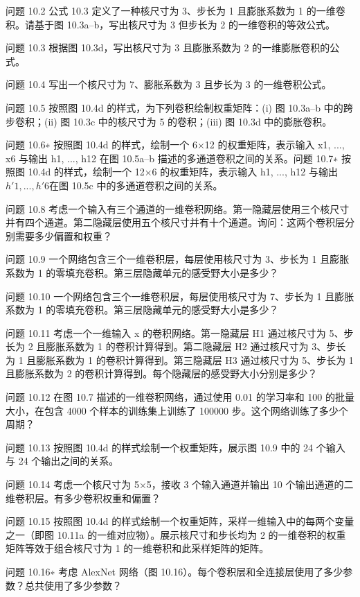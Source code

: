 \documentclass[lang=cn,newtx,10pt,scheme=chinese]{elegantbook}
\begin{document}
问题 10.2 公式 10.3 定义了一种核尺寸为 3、步长为 1 且膨胀系数为 1 的一维卷积。请基于图 10.3a–b，写出核尺寸为 3 但步长为 2 的一维卷积的等效公式。

问题 10.3 根据图 10.3d，写出核尺寸为 3 且膨胀系数为 2 的一维膨胀卷积的公式。

问题 10.4 写出一个核尺寸为 7、膨胀系数为 3 且步长为 3 的一维卷积公式。

问题 10.5 按照图 10.4d 的样式，为下列卷积绘制权重矩阵：(i) 图 10.3a–b 中的跨步卷积；(ii) 图 10.3c 中的核尺寸为 5 的卷积；(iii) 图 10.3d 中的膨胀卷积。

问题 10.6∗ 按照图 10.4d 的样式，绘制一个 6×12 的权重矩阵，表示输入 x1, ..., x6 与输出 h1, ..., h12 在图 10.5a–b 描述的多通道卷积之间的关系。问题 10.7∗ 按照图 10.4d 的样式，绘制一个 12×6 的权重矩阵，表示输入 h1, ..., h12 与输出 \(h \prime 1,...,h \prime 6 \)在图 10.5c 中的多通道卷积之间的关系。

问题 10.8 考虑一个输入有三个通道的一维卷积网络。第一隐藏层使用三个核尺寸并有四个通道。第二隐藏层使用五个核尺寸并有十个通道。询问：这两个卷积层分别需要多少偏置和权重？

问题 10.9 一个网络包含三个一维卷积层，每层使用核尺寸为 3、步长为 1 且膨胀系数为 1 的零填充卷积。第三层隐藏单元的感受野大小是多少？

问题 10.10 一个网络包含三个一维卷积层，每层使用核尺寸为 7、步长为 1 且膨胀系数为 1 的零填充卷积。第三层隐藏单元的感受野大小是多少？

问题 10.11 考虑一个一维输入 x 的卷积网络。第一隐藏层 H1 通过核尺寸为 5、步长为 2 且膨胀系数为 1 的卷积计算得到。第二隐藏层 H2 通过核尺寸为 3、步长为 1 且膨胀系数为 1 的卷积计算得到。第三隐藏层 H3 通过核尺寸为 5、步长为 1 且膨胀系数为 2 的卷积计算得到。每个隐藏层的感受野大小分别是多少？

问题 10.12 在图 10.7 描述的一维卷积网络，通过使用 0.01 的学习率和 100 的批量大小，在包含 4000 个样本的训练集上训练了 100000 步。这个网络训练了多少个周期？

问题 10.13 按照图 10.4d 的样式绘制一个权重矩阵，展示图 10.9 中的 24 个输入与 24 个输出之间的关系。

问题 10.14 考虑一个核尺寸为 5×5，接收 3 个输入通道并输出 10 个输出通道的二维卷积层。有多少卷积权重和偏置？

问题 10.15 按照图 10.4d 的样式绘制一个权重矩阵，采样一维输入中的每两个变量之一（即图 10.11a 的一维对应物）。展示核尺寸和步长均为 2 的一维卷积的权重矩阵等效于组合核尺寸为 1 的一维卷积和此采样矩阵的矩阵。

问题 10.16∗ 考虑 AlexNet 网络（图 10.16）。每个卷积层和全连接层使用了多少参数？总共使用了多少参数？
\end{document}
